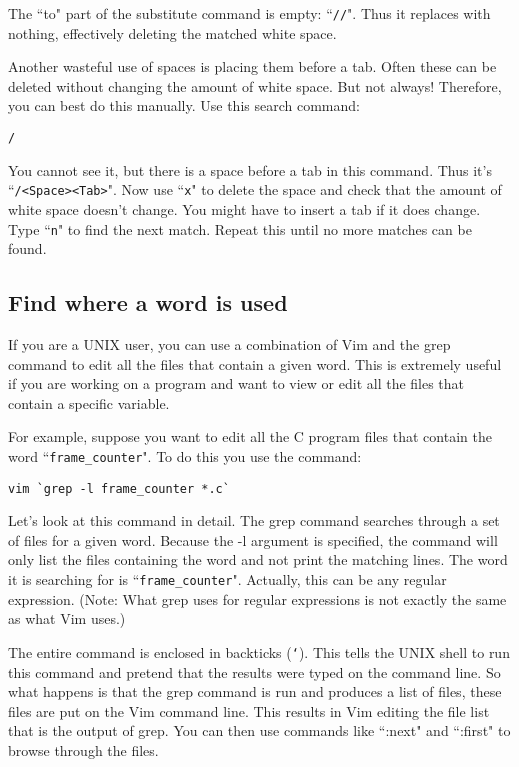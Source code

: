 The ``to" part of the substitute command is empty: ``\texttt{//}".
Thus it replaces with nothing, effectively deleting the matched white space.

Another wasteful use of spaces is placing them before a tab.
Often these can be deleted without changing the amount of white space.
But not always!  Therefore, you can best do this manually.
Use this search command:

\begin{Verbatim}[samepage=true]
 /   
\end{Verbatim}

You cannot see it, but there is a space before a tab in this command.
Thus it's ``\texttt{/<Space><Tab>}".
Now use ``\texttt{x}" to delete the space and check that the amount of white space doesn't change.
You might have to insert a tab if it does change.
Type ``\texttt{n}" to find the next match.
Repeat this until no more matches can be found.
\subsection{Find where a word is used}
If you are a UNIX user, you can use a combination of Vim and the grep command to edit all the files that contain a given word.
This is extremely useful if you are working on a program and want to view or edit all the files that contain a specific variable.

For example, suppose you want to edit all the C program files that contain the word ``\texttt{frame\_counter}".
To do this you use the command:

\begin{Verbatim}[samepage=true]
 vim `grep -l frame_counter *.c`
\end{Verbatim}

Let's look at this command in detail.
The grep command searches through a set of files for a given word.
Because the -l argument is specified, the command will only list the files containing the word and not print the matching lines.
The word it is searching for is ``\texttt{frame\_counter}".
Actually, this can be any regular expression.
(Note: What grep uses for regular expressions is not exactly the same as what Vim uses.)

The entire command is enclosed in backticks (\texttt{`}).
This tells the UNIX shell to run this command and pretend that the results were typed on the command line.
So what happens is that the grep command is run and produces a list of files, these files are put on the Vim command line.
This results in Vim editing the file list that is the output of grep.
You can then use commands like ``:next" and ``:first" to browse through the files.

